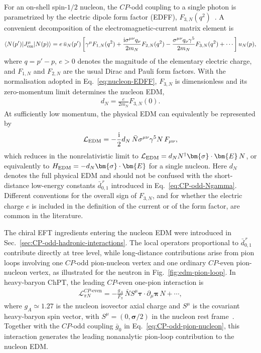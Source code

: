 \documentclass[review]{elsarticle}
\numberwithin{equation}{section}
\numberwithin{table}{section}
\numberwithin{figure}{section}
\def\i{\mathrm{i}}
\begin{document}
For an on-shell spin-$1/2$ nucleon, the $CP$-odd coupling to a single photon is parametrized by the electric dipole form factor (EDFF), $F_{3,N}(q^2)$~\cite{Hockings:2005cn,Mereghetti:2010kp,Guo:2012vf}. A convenient decomposition of the electromagnetic-current matrix element is
\begin{align}
    \langle N(p')|J_{\rm em}^{\mu}|N(p)\rangle 
    = 
    e\,\bar u_N(p')
    \left[\gamma^\mu F_{1,N}(q^2) + \frac{\i\sigma^{\mu\nu}q_\nu}{2m_N}F_{2,N}(q^2)
    - \frac{\sigma^{\mu\nu}q_\nu\gamma^5}{2m_N}F_{3,N}(q^2) +\cdots \right] u_N(p),
    \label{eq:nucleon-EDFF}
\end{align}
where $q=p'-p$, $e>0$ denotes the magnitude of the elementary electric charge, and $F_{1,N}$ and $F_{2,N}$ are the usual Dirac and Pauli form factors. With the normalisation adopted in Eq.~\eqref{eq:nucleon-EDFF}, $F_{3,N}$ is dimensionless and its zero-momentum limit determines the nucleon EDM,
\begin{align}
    d_N = \frac{e}{2m_N}F_{3,N}(0).
    \label{eq:nucleon-EDM-F3}
\end{align}
At sufficiently low momentum, the physical EDM can equivalently be represented by
\begin{align}
    \mathcal{L}_{\rm EDM} = -\frac{\i}{2}d_N\, \bar N\sigma^{\mu\nu}\gamma^5N\,F_{\mu\nu}, \label{eq:nucleon-EDM-operator}
\end{align}
which reduces in the nonrelativistic limit to $\mathcal{L}_{\rm EDM}=d_N N^\dagger\bm{\sigma}\cdot\bm{E}\,N$, or equivalently to $H_{\rm EDM}=-d_N\bm{\sigma}\cdot\bm{E}$ for a single nucleon. Here $d_N$ denotes the full physical EDM and should not be confused with the short-distance low-energy constants $\bar d_{0,1}^{\,r}$ introduced in Eq.~\eqref{eq:CP-odd-Ngamma}. Different conventions for the overall sign of $F_{3,N}$, and for whether the electric charge $e$ is included in the definition of the current or of the form factor, are common in the literature.

The chiral EFT ingredients entering the nucleon EDM were introduced in Sec.~\ref{sec:CP-odd-hadronic-interactions}. The local operators proportional to $\bar d_{0,1}^{\,r}$ contribute directly at tree level, while long-distance contributions arise from pion loops involving one $CP$-odd pion-nucleon vertex and one ordinary $CP$-even pion-nucleon vertex, as illustrated for the neutron in Fig.~\ref{fig:edm-pion-loop}. In heavy-baryon ChPT, the leading $CP$-even one-pion interaction is
\begin{align}
    \mathcal{L}_{\pi N}^{CP\text{-even}}
    =
    -\frac{g_A}{F_\pi}\,
    \bar N
    S^\mu
    \bm{\tau}\cdot\partial_\mu\bm{\pi}\,
    N
    +\cdots,
    \label{eq:CP-even-pion-nucleon}
\end{align}
where $g_A\simeq1.27$ is the nucleon isovector axial charge and $S^\mu$ is the covariant heavy-baryon spin vector, with $S^\mu=(0,\bm{\sigma}/2)$ in the nucleon rest frame~\cite{Jenkins:1990jv,Bernard:1995dp,Hockings:2005cn}. Together with the $CP$-odd coupling $\bar g_0$ in Eq.~\eqref{eq:CP-odd-pion-nucleon}, this interaction generates the leading nonanalytic pion-loop contribution to the nucleon EDM.
\end{document}
